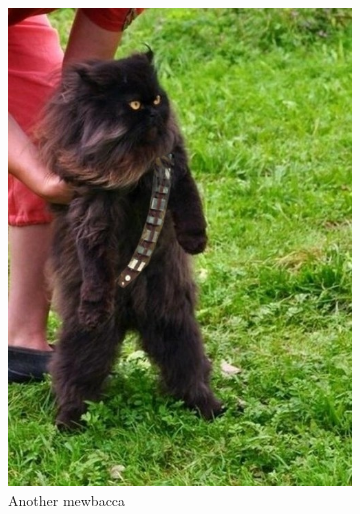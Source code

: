 \documentclass[12pt,a4paper]{article}
\begin{document}
\begin{figure}[ht!]
\begin{subfigure}[b]{0.3\textwidth}
                    \includegraphics[width=\textwidth]{mewbacca.jpg}
                    \caption{Another mewbacca}
                    \label{fig:mewsub2}
            \end{subfigure}
            ~
            \begin{subfigure}[b]{0.3\textwidth}

\end{subfigure}
\end{figure}
\end{document}

